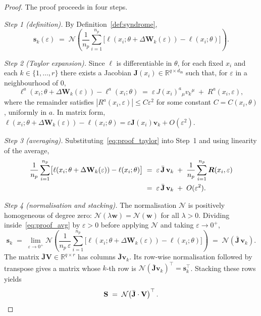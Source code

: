 \documentclass[11pt,a4paper]{article}
\theoremstyle{definition}
\newcommand{\Wm}{\mathbf{W}}
\newcommand{\Vm}{\mathbf{V}}
\newcommand{\Sm}{\mathbf{S}}
\newcommand{\Jm}{\mathbf{J}}
\newcommand{\vk}[1][]{\mathbf{v}_{#1}}
\newcommand{\sk}[1][]{\mathbf{s}_{#1}}
\newcommand{\Rbb}{\mathbb{R}}
\newcommand{\Nop}{\mathcal{N}}
\newcommand{\dimin}{d_{\mathrm{in}}}
\begin{document}
\begin{proof}
The proof proceeds in four steps.

\noindent\emph{Step 1 (definition).}
By Definition~\ref{def:syndrome},
\[
  \sk[k](\varepsilon) \;=\;
  \Nop\!\left(
    \frac{1}{n_p}\sum_{i=1}^{n_p}
    \bigl[\ell(x_i; \theta + \Delta\Wm_k(\varepsilon))
           -\ell(x_i;\theta)\bigr]
  \right).
\]

\noindent\emph{Step 2 (Taylor expansion).}
Since $\ell$ is differentiable in $\theta$, for each fixed $x_i$ and each $k\in\{1,\ldots,r\}$ there exists a Jacobian $\Jm(x_i) \in \Rbb^{q\times\dimin}$ such that, for $\varepsilon$ in a neighbourhood of $0$,
\begin{equation}
  \ell^a(x_i; \theta + \Delta\Wm_k(\varepsilon))
  - \ell^a(x_i;\theta)
  \;=\; \varepsilon\, J(x_i)^a{}_\mu v_k{}^\mu \;+\; R^a(x_i, \varepsilon),
  \label{eq:proof_taylor}
\end{equation}
where the remainder satisfies $|R^a(x_i,\varepsilon)| \leq C \varepsilon^2$ for some constant $C = C(x_i, \theta)$, uniformly in $a$. In matrix form, $\ell(x_i; \theta + \Delta\Wm_k(\varepsilon)) - \ell(x_i;\theta) = \varepsilon \Jm(x_i)\vk[k] + O(\varepsilon^2)$.

\noindent\emph{Step 3 (averaging).}
Substituting~\eqref{eq:proof_taylor} into Step~1 and using linearity of the average,
\begin{align}
  \frac{1}{n_p}\sum_{i=1}^{n_p}
  \bigl[\ell(x_i; \theta + \Delta\Wm_k(\varepsilon))
         -\ell(x_i;\theta)\bigr]
  &\;=\; \varepsilon\,\bar{\Jm}\,\vk[k] \;+\;
        \frac{1}{n_p}\sum_{i=1}^{n_p} \boldsymbol{R}(x_i,\varepsilon) \notag\\
  &\;=\; \varepsilon\,\bar{\Jm}\,\vk[k] \;+\; O(\varepsilon^2).
  \label{eq:proof_avg}
\end{align}

\noindent\emph{Step 4 (normalisation and stacking).}
The normalisation $\Nop$ is positively homogeneous of degree zero: $\Nop(\lambda\boldsymbol{w}) = \Nop(\boldsymbol{w})$ for all $\lambda > 0$. Dividing inside~\eqref{eq:proof_avg} by $\varepsilon > 0$ before applying $\Nop$ and taking $\varepsilon\to 0^+$,
\begin{equation}
  \sk[k]
  \;=\; \lim_{\varepsilon\to 0^+}
        \Nop\!\left(
          \frac{1}{n_p\,\varepsilon}\!\!
          \sum_{i=1}^{n_p}\!
          \bigl[\ell(x_i;\theta + \Delta\Wm_k(\varepsilon))-\ell(x_i;\theta)\bigr]
        \right)
  \;=\; \Nop\!\left(\bar{\Jm}\,\vk[k]\right) .
  \label{eq:proof_limit}
\end{equation}
The matrix $\bar{\Jm}\Vm \in \Rbb^{q\times r}$ has columns $\bar{\Jm}\vk[k]$. Its row-wise normalisation followed by transpose gives a matrix whose $k$-th row is $\Nop(\bar{\Jm}\vk[k])^\top = \sk[k]^\top$. Stacking these rows yields
\[
  \Sm \;=\; \Nop\!\left(\bar{\Jm}\cdot\Vm\right)^\top.
  \qedhere
\]
\end{proof}
\end{document}
